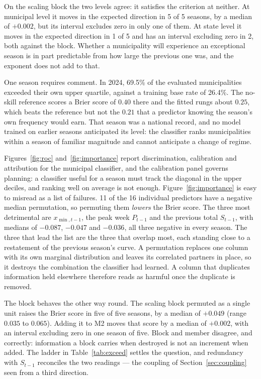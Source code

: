 \documentclass[english,10pt,b5paper]{article}
\begin{document}
On the scaling block the two levels agree: it satisfies the criterion at
neither. At municipal level it moves in the expected direction in 5 of 5
seasons, by a median of $+0.002$, but its interval excludes zero in only one
of them. At state level it moves in the expected direction in 1 of 5 and has
an interval excluding zero in 2, both against the block. Whether a
municipality will experience an exceptional season is in part predictable from
how large the previous one was, and the exponent does not add to that.

One season requires comment. In 2024, 69.5\% of the evaluated municipalities
exceeded their own upper quartile, against a training base rate of 26.4\%. The
no-skill reference scores a Brier score of $0.40$ there and the fitted rungs about
$0.25$, which beats the reference but not the $0.21$ that a predictor knowing the
season's own frequency would earn. That season was a national record, and no model
trained on earlier seasons anticipated its level: the classifier ranks
municipalities within a season of familiar magnitude and cannot anticipate a
change of regime.

Figures~\ref{fig:roc} and~\ref{fig:importance} report discrimination,
calibration and attribution for the municipal classifier, and the calibration
panel governs planning: a classifier useful for a season must track the
diagonal in the upper deciles, and ranking well on average is not enough.
Figure~\ref{fig:importance} is easy to misread as a list of failures. 11 of
the 16 individual predictors have a negative median permutation, so permuting
them \emph{lowers} the Brier score. The three most detrimental are
$x_{\min,t-1}$, the peak week $P_{t-1}$ and the previous total $S_{t-1}$, with
medians of $-0.087$, $-0.047$ and $-0.036$, all three negative in every
season. The three that lead the list are the three that overlap most, each
standing close to a restatement of the previous season's curve. A permutation
replaces one column with its own marginal distribution and leaves its
correlated partners in place, so it destroys the combination the classifier
had learned. A column that duplicates information held elsewhere therefore
reads as harmful once the duplicate is removed.

The block behaves the other way round. The scaling block permuted as a single
unit raises the Brier score in five of five seasons, by a median of $+0.049$
(range $0.035$ to $0.065$). Adding it to M2 moves that score by a median of
$+0.002$, with an interval excluding zero in one season of five. Block and
member disagree, and correctly: information a block carries when destroyed is
not an increment when added. The ladder in Table~\ref{tab:exceed} settles the
question, and redundancy with $S_{t-1}$ reconciles the two readings --- the
coupling of Section~\ref{sec:coupling} seen from a third direction.
\end{document}
